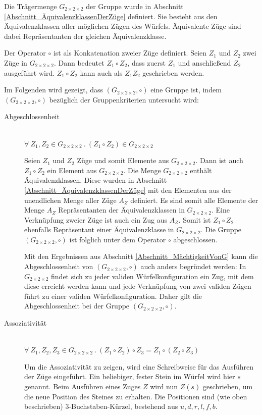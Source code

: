 \documentclass[12pt,a4paper, usenames, dvipsnames]{article}
\theoremstyle{mystyle}
\theoremstyle{definition}
\newcommand{\Gtwo}{\ensuremath{G_{2\times 2\times 2}}}
\begin{document}
Die Trägermenge $\Gtwo$ der Gruppe wurde in Abschnitt \ref{Abschnitt_ÄquivalenzklassenDerZüge} definiert. Sie besteht aus den Äquivalenzklassen aller möglichen Zügen des Würfels. Äquivalente Züge sind dabei Repräsentanten der gleichen Äquivalenzklasse.


Der Operator $\circ$ ist als Konkatenation zweier Züge definiert. Seien $Z_1$ und $Z_2$ zwei Züge in $\Gtwo$. Dann bedeutet $Z_1 \circ Z_2$, dass zuerst $Z_1$ und anschließend $Z_2$ ausgeführt wird. $Z_1 \circ Z_2$ kann auch als $Z_1Z_2$ geschrieben werden.

Im Folgenden wird gezeigt, dass $(\Gtwo, \circ)$ eine Gruppe ist, indem $(\Gtwo, \circ)$ bezüglich der Gruppenkriterien untersucht wird:


\begin{description}
\item [Abgeschlossenheit] \ \\
$\forall \ Z_1,Z_2 \in \Gtwo \  . \   (Z_1 \circ Z_2) \in \Gtwo $ 


Seien $Z_1$ und $Z_2$ Züge und somit Elemente aus $\Gtwo$. Dann ist auch $Z_1 \circ Z_2$ ein Element aus $\Gtwo$. Die Menge $\Gtwo$ enthält Äquivalenzklassen. Diese wurden in Abschnitt \ref{Abschnitt_ÄquivalenzklassenDerZüge} mit den Elementen aus der unendlichen Menge aller Züge $A_Z$ definiert. Es sind somit alle Elemente der Menge $A_Z$ Repräsentanten der Äquivalenzklassen in $\Gtwo$. Eine Verknüpfung zweier Züge ist auch ein Zug aus $A_Z$. Somit ist $Z_1 \circ Z_2$ ebenfalls Repräsentant einer Äquivalenzklasse in $\Gtwo$. Die Gruppe $(\Gtwo, \circ)$ ist folglich unter dem Operator $\circ$ abgeschlossen.
 
Mit den Ergebnissen aus Abschnitt \ref{Abschnitt_MächtigkeitVonG} kann die Abgeschlossenheit von $(\Gtwo, \circ)$ auch anders begründet werden: In $\Gtwo$ findet sich zu jeder validen Würfelkonfiguration ein Zug, mit dem diese erreicht werden kann und jede Verknüpfung von zwei validen Zügen führt zu einer validen Würfelkonfiguration. Daher gilt die Abgeschlossenheit bei der Gruppe $(\Gtwo, \circ)$.


\item [Assoziativität] \ \\
$\forall \ Z_1,Z_2,Z_3 \in \Gtwo \ . \ (Z_1 \circ Z_2) \circ Z_3 = Z_1 \circ (Z_2 \circ Z_3)$ 


Um die Assoziativität zu zeigen, wird eine Schreibweise für das Ausführen der Züge eingeführt. Ein beliebiger, fester Stein im Würfel wird hier $s$ genannt. Beim Ausführen eines Zuges $Z$ wird nun $Z(s)$ geschrieben, um die neue Position des Steines zu erhalten. Die Positionen sind (wie oben beschrieben) 3-Buchstaben-Kürzel, bestehend aus $u, d, r, l, f, b$. 


\end{description}
\end{document}
